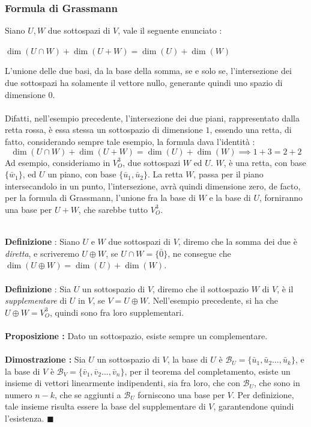 \documentclass[12pt, letterpaper]{article}
\newcommand{\acc}{\\\hphantom{}\\}
\begin{document}
\subsubsection{Formula di Grassmann}
Siano \(U,W\) due sottospazi di \(V\), vale il seguente enunciato : \begin{center}
    \(\dim(U\cap W)+\dim(U+W)=\dim(U)+\dim(W)\)
\end{center}
L'unione delle due basi, da la base della somma, se e solo se, l'intersezione dei due 
sottospazi ha solamente il vettore nullo, generante quindi uno spazio di dimensione 0.\acc 
Difatti, nell'esempio precedente, l'intersezione dei due piani, rappresentato dalla retta rossa, 
è essa stessa un sottospazio di dimensione \(1\), essendo una retta, di fatto, considerando 
sempre tale esempio, la formula dava l'identità : \begin{equation}
    \dim(U\cap W)+\dim(U+W)=\dim(U)+\dim(W)\implies 1+3=2+2
\end{equation}
Ad esempio, consideriamo in \(V_O^3\), due sottospazi \(W\) ed \(U\). \(W\), è una retta, con base 
\(\{\bar w_1\}\), ed \(U\) un piano, con base \(\{\bar u_1,\bar u_2\}\). La retta \(W\), passa 
per il piano intersecandolo in un punto, l'intersezione, avrà quindi dimensione zero, de facto, per 
la formula di Grassmann, l'unione fra la base di \(W\) e la base di \(U\), forniranno una base 
per \(U+W\), che sarebbe tutto \(V_O^3\).
\begin{figure}[h]
    \end{figure}
\\\textbf{Definizione} : Siano \(U\) e \(W\) due sottospazi di \(V\), diremo che la 
somma dei due è \textit{diretta}, e scriveremo \(U\oplus W\), se \(U\cap W = \{\bar 0\}\), ne consegue 
che \(\dim(U\oplus W)=\dim(U)+\dim(W)\).\acc
\textbf{Definizione} : Sia \(U\) un sottospazio di \(V\), diremo che il sottospazio 
\(W\) di \(V\), è il \textit{supplementare} di \(U\) in \(V\), se \(V=U\oplus W\). Nell'esempio precedente, 
si ha che \(U\oplus W=V_O^3\), quindi sono fra loro supplementari.\acc 
\textbf{Proposizione :} Dato un sottospazio, esiste sempre un complementare.\acc 
\textbf{Dimostrazione :} Sia \(U\) un sottospazio di \(V\), la base di \(U\) è 
\(\mathcal{B}_U=\{\bar u_1,\bar u_2\dots,\bar u_k\}\), e la base di \(V\) è 
\(\mathcal{B}_V=\{\bar v_1,\bar v_2\dots,\bar v_n\}\), per il teorema del completamento, 
esiste un insieme di vettori linearmente indipendenti, sia fra loro, che con \(\mathcal{B}_U\), 
che sono in numero \(n-k\), che se aggiunti a \(\mathcal{B}_U\) forniscono una base per \(V\). Per 
definizione, tale insieme risulta essere la base del supplementare di \(V\), garantendone quindi 
l'esistenza. \(\blacksquare\)
\end{document}
